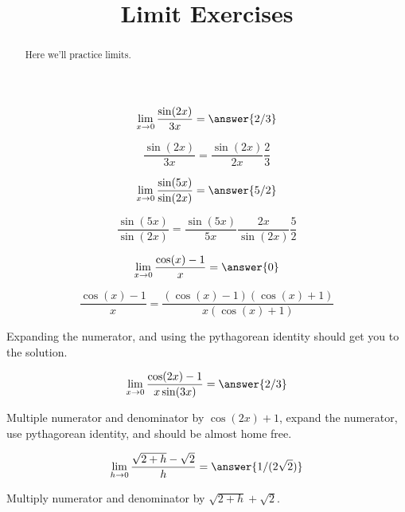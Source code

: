 \documentclass[handout]{ximera}
\title[Exercises:]{Limit Exercises}
\begin{document}
\begin{abstract}
  Here we'll practice limits.
\end{abstract}
\maketitle

\begin{exercise}
\[\lim_{x \to 0} \frac{\sin(2x)}{3x} = \answer{2/3}\]
\begin{hint}
	\[\frac{\sin(2x)}{3x} = \frac{\sin(2x)}{2x} \frac{2}{3}\]
\end{hint}
\end{exercise}

\begin{exercise}
\[\lim_{x \to 0} \frac{\sin(5x)}{\sin(2x)} = \answer{5/2}\]
\begin{hint}
	\[ \frac{\sin(5x)}{\sin(2x)} = \frac{\sin(5x)}{5x} \frac{2x}{\sin(2x)} \frac{5}{2}\]
\end{hint}
\end{exercise}

\begin{exercise}
\[\lim_{x \to 0} \frac{\cos(x)-1}{x} = \answer{0}\]
\begin{hint}
	\[\frac{\cos(x)-1}{x} = \frac{(\cos(x)-1)(\cos(x)+1)}{x(\cos(x)+1)}\]
\end{hint}
\begin{hint}
	Expanding the numerator, and using the pythagorean identity should get you to the solution.
\end{hint}
\end{exercise}

\begin{exercise}
\[\lim_{x \to 0} \frac{\cos(2x)-1}{x\sin(3x)} = \answer{2/3}\]
\begin{hint}
	Multiple numerator and denominator by $\cos(2x)+1$, expand the numerator, use pythagorean identity, and should be almost home free.
\end{hint}
\end{exercise}

\begin{exercise}
	\[\lim_{h \to 0} \frac{\sqrt{2+h} - \sqrt{2}}{h} = \answer{1/(2\sqrt{2})}\]
	\begin{hint}
		Multiply numerator and denominator by $\sqrt{2+h}+\sqrt{2}$.
	\end{hint}
\end{exercise}
\end{document}
